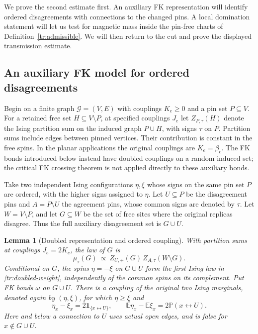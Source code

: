 \documentclass[11pt]{article}
\newtheorem{lemma}[theorem]{Lemma}
\theoremstyle{definition}
\theoremstyle{remark}
\numberwithin{equation}{section}
\begin{document}
We prove the second estimate first. An auxiliary FK representation
will identify ordered disagreements with connections to the changed
pins. A local domination statement will let us test for magnetic mass
inside the pin-free charts of Definition~\ref{tr:admissible}. We will
then return to the cut and prove the displayed transmission estimate.
\subsection{An auxiliary FK model for ordered disagreements}
\label{tr:doubled-subsection}

Begin on a finite graph $\mathcal G=(V,E)$ with couplings $K_e\geq0$
and a pin set $P\subseteq V$. For a retained free set $H\subseteq V\setminus P$,
at specified couplings $J_e$ let $Z_{P,\tau}(H)$ denote the Ising
partition sum on the induced graph $P\cup H$, with signs $\tau$ on $P$. Partition sums include edges between
pinned vertices. Their contribution is constant in the free spins.
In the planar applications the original couplings are $K_e=\beta_c$.
The FK bonds introduced below instead have doubled couplings on a
random induced set; the critical FK crossing theorem is not applied
directly to these auxiliary bonds.

Take two independent Ising configurations $\eta,\xi$ whose signs on the
same pin set $P$ are ordered, with the higher signs assigned to $\eta$.
Let $U\subseteq P$ be the disagreement pins and $A=P\setminus U$ the
agreement pins, whose common signs are denoted by $\tau$. Let $W=V\setminus
P$, and let $G\subseteq W$ be the set of free sites where the original
replicas disagree. Thus the full auxiliary disagreement set is $G\cup U$.

\begin{lemma}[Doubled representation and ordered coupling]
\label{tr:doubled-coupling}
With partition sums at couplings $J_e=2K_e$, the law of $G$ is
\begin{equation}
\label{tr:doubled-weight}
 \mu_\tau(G)\ \propto\ Z_{U,+}(G)\,Z_{A,\tau}(W\setminus G).
\end{equation}
Conditional on $G$, the spins $\eta=-\xi$ on $G\cup U$ form the first
Ising law in \eqref{tr:doubled-weight}, independently of the common spins
on its complement. Put FK bonds $\omega$ on $G\cup U$. There is a coupling
of the original two Ising marginals, denoted again by $(\eta,\xi)$, for
which $\eta\geq\xi$ and
\begin{equation}
\label{tr:mean-connection}
 \eta_x-\xi_x=2\mathbf1_{\{x\longleftrightarrow U\}},
 \qquad
 \mathbb E\eta_x-\mathbb E\xi_x
 =2\mathbb P(x\longleftrightarrow U).
\end{equation}
Here and below a connection to $U$ uses actual open edges, and is false for
$x\notin G\cup U$.
\end{lemma}
\end{document}
